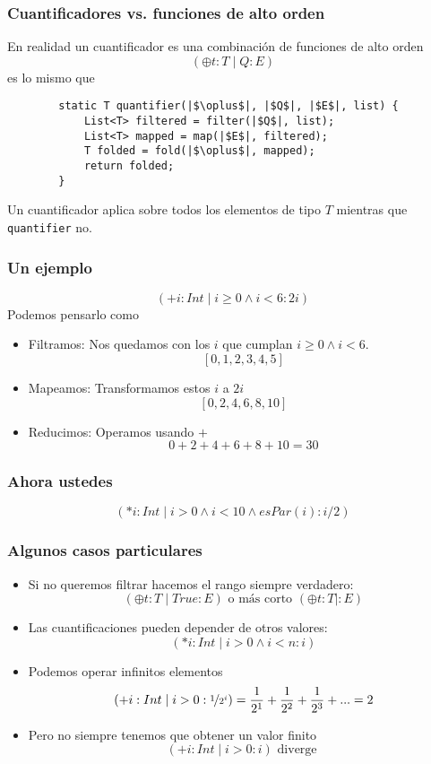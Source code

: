 \documentclass{beamer}
\begin{document}
\begin{frame}[fragile]
    \frametitle{Cuantificadores vs. funciones de alto orden}
    En realidad un cuantificador es una combinación de funciones de alto orden
        $$(\oplus t:T \mid Q:E)$$
    es lo mismo que
    \begin{verbatim}
        static T quantifier(|$\oplus$|, |$Q$|, |$E$|, list) {
            List<T> filtered = filter(|$Q$|, list);
            List<T> mapped = map(|$E$|, filtered);
            T folded = fold(|$\oplus$|, mapped);
            return folded;
        } 
    \end{verbatim}
    Un cuantificador aplica sobre todos los elementos de tipo $T$  mientras que \verb|quantifier| no.
\end{frame}

\begin{frame}[fragile]
    \frametitle{Un ejemplo}
    $$(+ i:Int \mid i \geq 0 \land i < 6: 2i)$$
    Podemos pensarlo como
    \begin{itemize}
        \item Filtramos: Nos quedamos con los $i$ que cumplan $i \geq 0 \land i < 6$.
            $$[0, 1, 2, 3, 4, 5]$$
        \item Mapeamos: Transformamos estos $i$ a $2i$
            $$[0, 2, 4, 6, 8, 10]$$
        \item Reducimos: Operamos usando $+$
            $$0 + 2 + 4 + 6 + 8 + 10 = 30$$
    \end{itemize}
\end{frame}

\begin{frame}[fragile]
    \frametitle{Ahora ustedes}
    $$(* i:Int \mid i > 0 \land i < 10 \land esPar(i): i/2)$$
    \vspace*{165 pt}
\end{frame}

\begin{frame}[fragile]  
    \frametitle{Algunos casos particulares}
    \begin{itemize}
    \item Si no queremos filtrar hacemos el rango siempre verdadero:
        $$(\oplus t:T \mid True:E)\text{ o más corto }(\oplus t:T \mid:E)$$
    \item Las cuantificaciones pueden depender de otros valores:
        $$(* i:Int \mid i>0 \land i < n :i)$$
    \item Podemos operar infinitos elementos
        $$(+ i:Int \mid i > 0:\nicefrac{1}{2^{i}}) = \frac{1}{2^{1}} + \frac{1}{2^{2}} + \frac{1}{2^{3}} + ... = 2$$
    \item Pero no siempre tenemos que obtener un valor finito
        $$(+ i:Int \mid i > 0: i) \text{ diverge }$$
    \end{itemize}
\end{frame}
\end{document}
